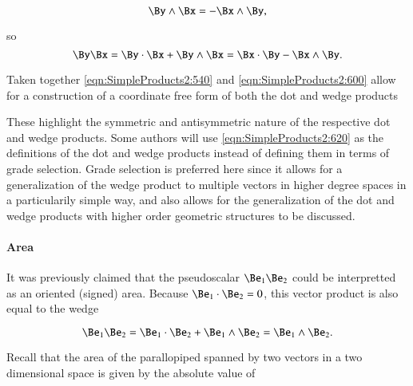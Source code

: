 \begin{dmath}\label{eqn:SimpleProducts2:580}
\By \wedge \Bx = -\Bx \wedge \By,
\end{dmath}

so
\begin{dmath}\label{eqn:SimpleProducts2:600}
\By \Bx
= \By \cdot \Bx + \By \wedge \Bx
= \Bx \cdot \By - \Bx \wedge \By.
\end{dmath}

Taken together \cref{eqn:SimpleProducts2:540} and \cref{eqn:SimpleProducts2:600} allow for a construction of a coordinate free form of both the dot and wedge products


These highlight the symmetric and antisymmetric nature of the respective dot and wedge products.
Some authors will use \cref{eqn:SimpleProducts2:620} as the definitions of the dot and wedge products instead of defining them in terms of grade selection.
Grade selection is preferred here since it allows for a generalization of the wedge product to multiple vectors in higher degree spaces in a particularily simple way, and also allows for the generalization of the dot and wedge products with higher order geometric structures to be discussed.

\paragraph{Area}

It was previously claimed that the pseudoscalar \( \Be_1 \Be_2 \) could be interpretted as an oriented (signed) area.
Because \( \Be_1 \cdot \Be_2 = 0 \), this vector product is also equal to the wedge

\begin{dmath}\label{eqn:SimpleProducts2:640}
\Be_1 \Be_2 = \Be_1 \cdot \Be_2 +
\Be_1 \wedge \Be_2
=
\Be_1 \wedge \Be_2.
\end{dmath}

Recall that the area of the parallopiped spanned by two vectors in a two dimensional space is given by the absolute value of

